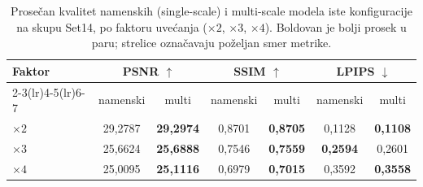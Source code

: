 \begin{table}[H]
    \centering
    \caption{Prosečan kvalitet namenskih (single-scale) i multi-scale modela iste konfiguracije na skupu Set14, po faktoru uvećanja ($\times2$, $\times3$, $\times4$). Boldovan je bolji prosek u paru; strelice označavaju poželjan smer metrike.}
    \label{tab:multiscale_Set14}
    \begingroup
    \small
    \setlength{\tabcolsep}{5pt}
    \renewcommand{\arraystretch}{1.15}
    \begin{tabular}{@{}lcccccc@{}}
        \toprule
        Faktor & \multicolumn{2}{c}{PSNR $\uparrow$} & \multicolumn{2}{c}{SSIM $\uparrow$} & \multicolumn{2}{c}{LPIPS $\downarrow$} \\
        \cmidrule(lr){2-3}\cmidrule(lr){4-5}\cmidrule(lr){6-7}
         & namenski & multi & namenski & multi & namenski & multi \\
        \midrule
        $\times2$ & 29,2787 & \textbf{29,2974} & 0,8701 & \textbf{0,8705} & 0,1128 & \textbf{0,1108} \\
        $\times3$ & 25,6624 & \textbf{25,6888} & 0,7546 & \textbf{0,7559} & \textbf{0,2594} & 0,2601 \\
        $\times4$ & 25,0095 & \textbf{25,1116} & 0,6979 & \textbf{0,7015} & 0,3592 & \textbf{0,3558} \\
        \bottomrule
    \end{tabular}
    \endgroup
\end{table}